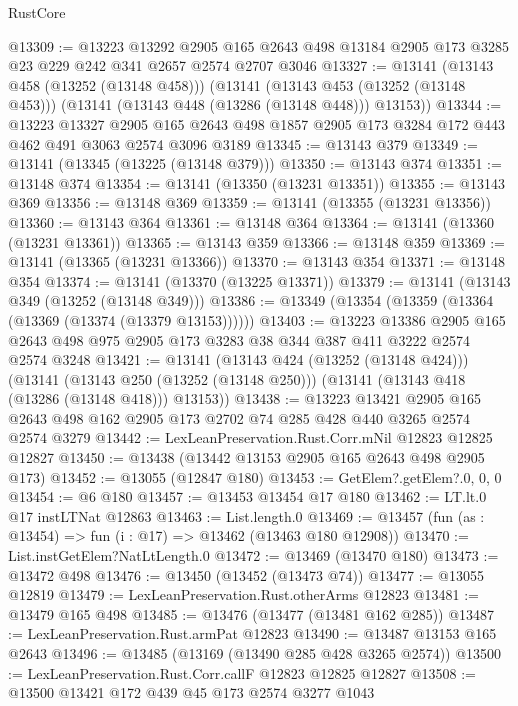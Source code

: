 \begin{lexlean}{RustCore}
\begin{coremodule}
@13309 := @13223
    @13292
    @2905
    @165
    @2643
    @498
    @13184
    @2905
    @173
    @3285
    @23
    @229
    @242
    @341
    @2657
    @2574
    @2707
    @3046
@13327 := @13141
    (@13143 @458 (@13252 (@13148 @458)))
    (@13141
      (@13143 @453 (@13252 (@13148 @453)))
      (@13141 (@13143 @448 (@13286 (@13148 @448))) @13153))
@13344 := @13223
    @13327
    @2905
    @165
    @2643
    @498
    @1857
    @2905
    @173
    @3284
    @172
    @443
    @462
    @491
    @3063
    @2574
    @3096
    @3189
@13345 := @13143 @379
@13349 := @13141 (@13345 (@13225 (@13148 @379)))
@13350 := @13143 @374
@13351 := @13148 @374
@13354 := @13141 (@13350 (@13231 @13351))
@13355 := @13143 @369
@13356 := @13148 @369
@13359 := @13141 (@13355 (@13231 @13356))
@13360 := @13143 @364
@13361 := @13148 @364
@13364 := @13141 (@13360 (@13231 @13361))
@13365 := @13143 @359
@13366 := @13148 @359
@13369 := @13141 (@13365 (@13231 @13366))
@13370 := @13143 @354
@13371 := @13148 @354
@13374 := @13141 (@13370 (@13225 @13371))
@13379 := @13141 (@13143 @349 (@13252 (@13148 @349)))
@13386 := @13349 (@13354 (@13359 (@13364 (@13369 (@13374 (@13379 @13153))))))
@13403 := @13223
    @13386
    @2905
    @165
    @2643
    @498
    @975
    @2905
    @173
    @3283
    @38
    @344
    @387
    @411
    @3222
    @2574
    @2574
    @3248
@13421 := @13141
    (@13143 @424 (@13252 (@13148 @424)))
    (@13141
      (@13143 @250 (@13252 (@13148 @250)))
      (@13141 (@13143 @418 (@13286 (@13148 @418))) @13153))
@13438 := @13223
    @13421
    @2905
    @165
    @2643
    @498
    @162
    @2905
    @173
    @2702
    @74
    @285
    @428
    @440
    @3265
    @2574
    @2574
    @3279
@13442 := LexLeanPreservation.Rust.Corr.mNil @12823 @12825 @12827
@13450 := @13438 (@13442 @13153 @2905 @165 @2643 @498 @2905 @173)
@13452 := @13055 (@12847 @180)
@13453 := GetElem?.getElem?.{0, 0, 0}
@13454 := @6 @180
@13457 := @13453 @13454 @17 @180
@13462 := LT.lt.{0} @17 instLTNat @12863
@13463 := List.length.{0}
@13469 := @13457 (fun (as : @13454) => fun (i : @17) => @13462 (@13463 @180 @12908))
@13470 := List.instGetElem?NatLtLength.{0}
@13472 := @13469 (@13470 @180)
@13473 := @13472 @498
@13476 := @13450 (@13452 (@13473 @74))
@13477 := @13055 @12819
@13479 := LexLeanPreservation.Rust.otherArms @12823
@13481 := @13479 @165 @498
@13485 := @13476 (@13477 (@13481 @162 @285))
@13487 := LexLeanPreservation.Rust.armPat @12823
@13490 := @13487 @13153 @165 @2643
@13496 := @13485 (@13169 (@13490 @285 @428 @3265 @2574))
@13500 := LexLeanPreservation.Rust.Corr.callF @12823 @12825 @12827
@13508 := @13500 @13421 @172 @439 @45 @173 @2574 @3277 @1043

\end{coremodule}
\end{lexlean}
